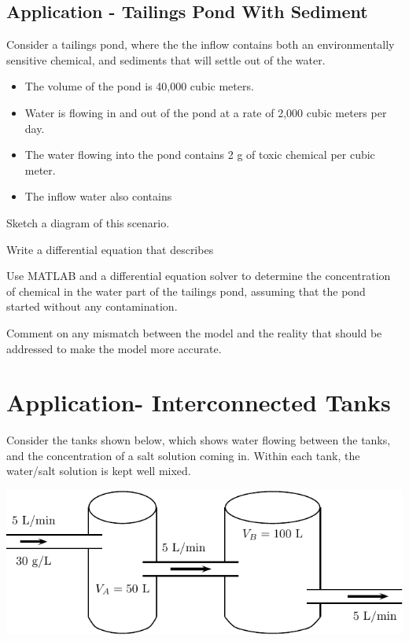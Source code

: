 \newpage

\subsection*{Application - Tailings Pond With Sediment}
Consider a tailings pond, where the the inflow contains both an
environmentally sensitive chemical, and sediments that will settle out
of the water.

\begin{itemize}
\item The volume of the pond is 40,000 cubic meters.
\item Water is flowing in and out of the pond at a rate of 2,000 cubic
  meters per day.
\item The water flowing into the pond contains 2 g of toxic chemical
  per cubic meter.
\item The inflow water also contains 
\end{itemize}

\problem Sketch a diagram of this scenario.

\newpage

\problem Write a differential equation that describes

\newpage

\problem Use MATLAB and a differential equation solver to determine
the concentration of chemical in the water part of the tailings pond,
assuming that the pond started without any contamination.


\newpage

\problem Comment on any mismatch between the model and the reality
that should be addressed to make the model more accurate.

\newpage
{}
\section*{Application- Interconnected Tanks}

\noindent
Consider the tanks shown below, which shows water flowing between the
tanks, and the concentration of a salt solution coming in.  Within
each tank, the water/salt solution is kept well mixed.
\begin{center}
\includegraphics[width=0.7\linewidth]{graphics/notes_09_tanks1}
\end{center}

